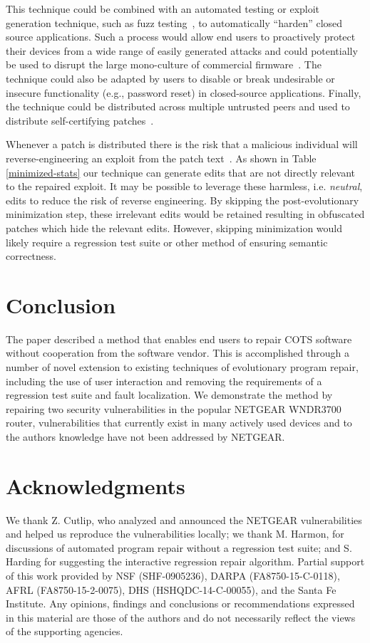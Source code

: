 \documentclass{sig-alternate}
\begin{document}
This technique could be combined with an automated testing or exploit
generation technique, such as fuzz testing~\cite{miller1990empirical},
to automatically ``harden'' closed source applications.  Such a
process would allow end users to proactively protect their devices
from a wide range of easily generated attacks and could potentially be
used to disrupt the large mono-culture of commercial
firmware~\cite{ieee-sp-09}.  The technique could also be adapted by
users to disable or break undesirable or insecure functionality (e.g.,
password reset) in closed-source applications.  Finally, the technique
could be distributed across multiple untrusted peers and used to
distribute self-certifying
patches~\cite{costa2008vigilante,schulte2013embedded}.

Whenever a patch is distributed there is the risk that a malicious
individual will reverse-engineering an exploit from the patch
text~\cite{brumley2008automatic}.  As shown in Table
\ref{minimized-stats} our technique can generate edits that are not
directly relevant to the repaired exploit.  It may be possible to
leverage these harmless, i.e. {\em neutral}, edits to reduce the risk
of reverse engineering.  By skipping the post-evolutionary
minimization step, these irrelevant edits would be retained resulting
in obfuscated patches which hide the relevant edits.  However,
skipping minimization would likely require a regression test suite or
other method of ensuring semantic correctness.

\section{Conclusion}

The paper described a method that enables end users to repair COTS
software without cooperation from the software vendor.  This is
accomplished through a number of novel extension to existing
techniques of evolutionary program repair, including the use of user
interaction and removing the requirements of a regression test suite
and fault localization.  We demonstrate the method by repairing two
security vulnerabilities in the popular NETGEAR WNDR3700 router,
vulnerabilities that currently exist in many actively used devices and
to the authors knowledge have not been addressed by NETGEAR.

\section{Acknowledgments}
\label{sec-7}
We thank Z. Cutlip, who analyzed and announced the NETGEAR
vulnerabilities and helped us reproduce the vulnerabilities locally;
we thank M. Harmon, for discussions of automated program repair
without a regression test suite; and S. Harding for suggesting the
interactive regression repair algorithm.  Partial support of this work
provided by NSF (SHF-0905236), DARPA (FA8750-15-C-0118), AFRL
(FA8750-15-2-0075), DHS (HSHQDC-14-C-00055), and the Santa Fe
Institute.  Any opinions, findings and conclusions or recommendations
expressed in this material are those of the authors and do not
necessarily reflect the views of the supporting agencies.


\small

\end{document}
